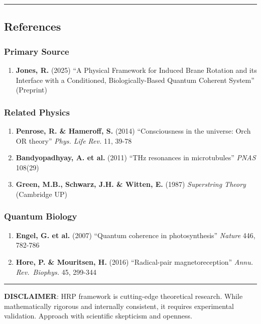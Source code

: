 \begin{center}\rule{0.5\linewidth}{0.5pt}\end{center}

\subsection{References}\label{references}

\subsubsection{Primary Source}\label{primary-source}

\begin{enumerate}
\def\labelenumi{\arabic{enumi}.}
\tightlist
\item
  \textbf{Jones, R.} (2025) ``A Physical Framework for Induced Brane
  Rotation and its Interface with a Conditioned, Biologically-Based
  Quantum Coherent System'' (Preprint)
\end{enumerate}

\subsubsection{Related Physics}\label{related-physics}

\begin{enumerate}
\def\labelenumi{\arabic{enumi}.}
\setcounter{enumi}{1}
\tightlist
\item
  \textbf{Penrose, R. \& Hameroff, S.} (2014) ``Consciousness in the
  universe: Orch OR theory'' \emph{Phys. Life Rev.} 11, 39-78
\item
  \textbf{Bandyopadhyay, A. et al.} (2011) ``THz resonances in
  microtubules'' \emph{PNAS} 108(29)
\item
  \textbf{Green, M.B., Schwarz, J.H. \& Witten, E.} (1987)
  \emph{Superstring Theory} (Cambridge UP)
\end{enumerate}

\subsubsection{Quantum Biology}\label{quantum-biology}

\begin{enumerate}
\def\labelenumi{\arabic{enumi}.}
\setcounter{enumi}{4}
\tightlist
\item
  \textbf{Engel, G. et al.} (2007) ``Quantum coherence in
  photosynthesis'' \emph{Nature} 446, 782-786
\item
  \textbf{Hore, P. \& Mouritsen, H.} (2016) ``Radical-pair
  magnetoreception'' \emph{Annu. Rev.~Biophys.} 45, 299-344
\end{enumerate}

\begin{center}\rule{0.5\linewidth}{0.5pt}\end{center}

\textbf{ DISCLAIMER}: HRP framework is cutting-edge theoretical
research. While mathematically rigorous and internally consistent, it
requires experimental validation. Approach with scientific skepticism
and openness.
